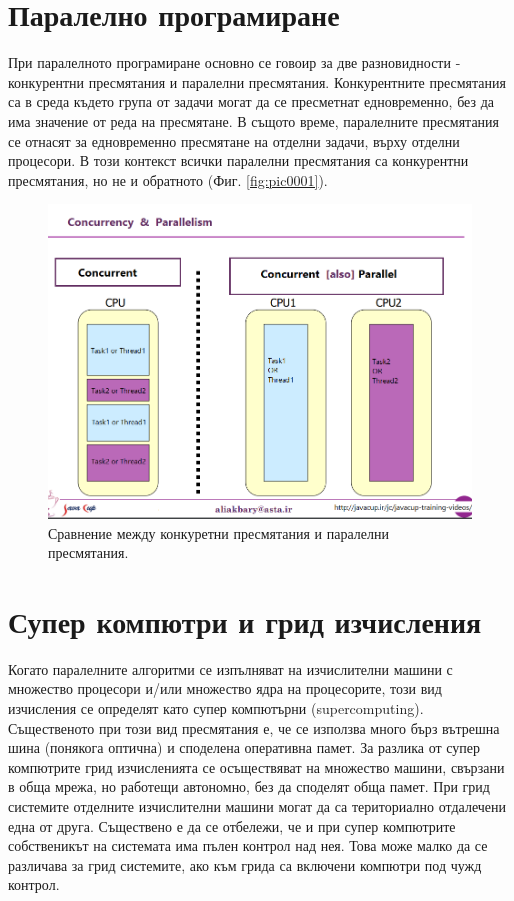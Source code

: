 \documentclass[book,14pt,oneside,openany]{memoir}
\begin{document}
\section{Паралелно програмиране}

При паралелното програмиране основно се говоир за две разновидности - конкурентни пресмятания и паралелни пресмятания. Конкурентните пресмятания са в среда където група от задачи могат да се пресметнат едновременно, без да има значение от реда на пресмятане. В същото време, паралелните пресмятания се отнасят за едновременно пресмятане на отделни задачи, върху отделни процесори. В този контекст всички паралелни пресмятания са конкурентни пресмятания, но не и обратното (Фиг. \ref{fig:pic0001}). 

\begin{figure}[h!]
  \centering
  \includegraphics[width=1.0\linewidth]{./images/pic0002.png}
  \caption{Сравнение между конкуретни пресмятания и паралелни пресмятания.}
\label{fig:pic0002}
\end{figure}

\section{Супер компютри и грид изчисления}

Когато паралелните алгоритми се изпълняват на изчислителни машини с множество процесори и/или множество ядра на процесорите, този вид изчисления се определят като супер компютърни (supercomputing). Същественото при този вид пресмятания е, че се използва много бърз вътрешна шина (понякога оптична) и споделена оперативна памет. За разлика от супер компютрите грид изчисленията се осъществяват на множество машини, свързани в обща мрежа, но работещи автономно, без да споделят обща памет. При грид системите отделните изчислителни машини могат да са териториално отдалечени една от друга. Съществено е да се отбележи, че и при супер компютрите собственикът на системата има пълен контрол над нея. Това може малко да се различава за грид системите, ако към грида са включени компютри под чужд контрол. 
\end{document}
